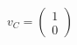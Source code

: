 \documentclass[preview]{standalone}
\begin{document}
\begin{align*}
v_C = \begin{pmatrix} 1 \\ 0 \end{pmatrix}
\end{align*}
\end{document}
